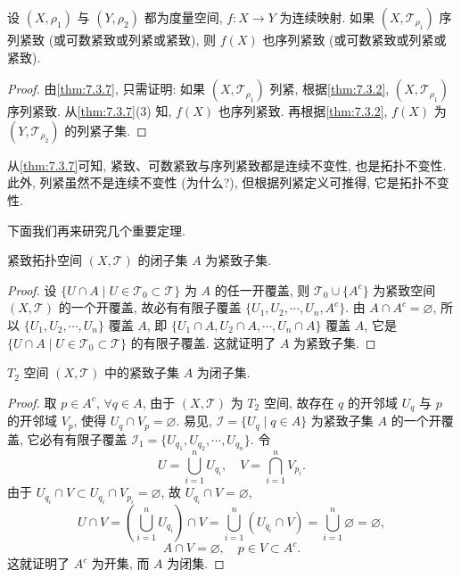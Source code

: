 \begin{corollary}\label{cor:7.3.2}
设 $(X, \rho_{1})$ 与 $(Y, \rho_{2})$ 都为度量空间, $f\colon X \to Y$ 为连续映射. 如果 $(X, \mathcal{T}_{\rho_{1}})$ 序列紧致 (或可数紧致或列紧或紧致), 则 $f(X)$ 也序列紧致 (或可数紧致或列紧或紧致).
\end{corollary}

\begin{proof}
由\cref{thm:7.3.7}, 只需证明: 如果 $(X, \mathcal{T}_{\rho_{1}})$ 列紧, 根据\cref{thm:7.3.2}, $(X, \mathcal{T}_{\rho_{1}})$ 序列紧致. 从\cref{thm:7.3.7}(3) 知, $f(X)$ 也序列紧致. 再根据\cref{thm:7.3.2}, $f(X)$ 为 $(Y, \mathcal{T}_{\rho_{2}})$ 的列紧子集.
\end{proof}

从\cref{thm:7.3.7}可知, 紧致、可数紧致与序列紧致都是连续不变性, 也是拓扑不变性. 此外, 列紧虽然不是连续不变性 (为什么?), 但根据列紧定义可推得, 它是拓扑不变性.

下面我们再来研究几个重要定理.

\begin{theorem}\label{thm:7.3.8}
紧致拓扑空间 $(X, \mathcal{T})$ 的闭子集 $A$ 为紧致子集.
\end{theorem}

\begin{proof}
设 $\{U \cap A \mid U \in \mathcal{T}_{0} \subset \mathcal{T}\}$ 为 $A$ 的任一开覆盖, 则 $\mathcal{T}_{0} \cup \{A^{c}\}$ 为紧致空间 $(X, \mathcal{T})$ 的一个开覆盖, 故必有有限子覆盖 $\{U_{1}, U_{2}, \cdots, U_{n}, A^{c}\}$. 由 $A \cap A^{c} = \varnothing$, 所以 $\{U_{1}, U_{2}, \cdots, U_{n}\}$ 覆盖 $A$, 即 $\{U_{1} \cap A, U_{2} \cap A, \cdots, U_{n} \cap A\}$ 覆盖 $A$, 它是 $\{U \cap A \mid U \in \mathcal{T}_{0} \subset \mathcal{T}\}$ 的有限子覆盖. 这就证明了 $A$ 为紧致子集.
\end{proof}

\begin{theorem}\label{thm:7.3.9}
$T_{2}$ 空间 $(X, \mathcal{T})$ 中的紧致子集 $A$ 为闭子集.
\end{theorem}

\begin{proof}
取 $p \in A^{c}$, $\forall q \in A$, 由于 $(X, \mathcal{T})$ 为 $T_{2}$ 空间, 故存在 $q$ 的开邻域 $U_{q}$ 与 $p$ 的开邻域 $V_{p}$, 使得 $U_{q} \cap V_{p} = \varnothing$. 易见, $\mathcal{I} = \{U_{q} \mid q \in A\}$ 为紧致子集 $A$ 的一个开覆盖, 它必有有限子覆盖 $\mathcal{I}_{1} = \{U_{q_{1}}, U_{q_{2}}, \cdots, U_{q_{n}}\}$. 令
\[
  U = \bigcup_{i=1}^{n} U_{q_{i}}, \quad V = \bigcap_{i=1}^{n} V_{p_{i}}.
\]
由于 $U_{q_{i}} \cap V \subset U_{q_{i}} \cap V_{p_{i}} = \varnothing$, 故 $U_{q_{i}} \cap V = \varnothing$,
\[
  U \cap V = \left(\bigcup_{i=1}^{n} U_{q_{i}}\right) \cap V = \bigcup_{i=1}^{n} \left(U_{q_{i}} \cap V\right) = \bigcup_{i=1}^{n} \varnothing = \varnothing,
\]
\[
  A \cap V = \varnothing, \quad p \in V \subset A^{c}.
\]
这就证明了 $A^{c}$ 为开集, 而 $A$ 为闭集.
\end{proof}

